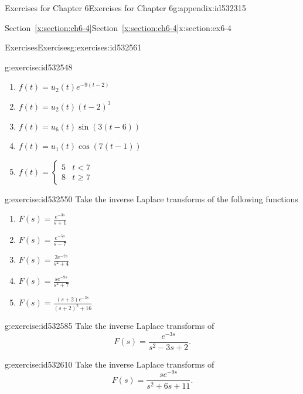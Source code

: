 \documentclass[oneside,10pt,]{book}
\newcommand{\xreffont}{\relax}
\numberwithin{equation}{section}
\numberwithin{equation}{section}
\newcommand{\lt}{<}
\newcommand{\amp}{&}
\begin{document}
\begin{appendixptx}{Exercises for Chapter 6}{}{Exercises for Chapter 6}{}{}{g:appendix:id532315}
\begin{sectionptx}{Section~{\xreffont\ref*{x:section:ch6-4}}}{}{Section~{\xreffont\ref*{x:section:ch6-4}}}{}{}{x:section:ex6-4}
\begin{exercises-subsection-numberless}{Exercises}{}{Exercises}{}{}{g:exercises:id532561}
\begin{divisionexercise}{1}{}{}{g:exercise:id532548}
\begin{enumerate}[label=(\alph*)]
\item{}\(\displaystyle f(t)=u_{2}(t)e^{-9\left(t-2\right)}\)%
\item{}\(\displaystyle f(t)=u_{2}(t)\left(t-2\right)^{3}\)%
\item{}\(\displaystyle f(t)=u_{6}(t)\sin\left(3\left(t-6\right)\right)\)%
\item{}\(\displaystyle f(t)=u_{1}(t)\cos\left(7\left(t-1\right)\right)\)%
\item{}\(\displaystyle {\displaystyle f(t)=\begin{cases}
5 \amp t \lt 7\\
8 \amp t\geq7
\end{cases}} \)%
\end{enumerate}
%
\end{divisionexercise}%
\begin{divisionexercise}{2}{}{}{g:exercise:id532550}%
Take the inverse Laplace transforms of the following functions%
\begin{enumerate}[label=(\alph*)]
\item{}\(\displaystyle F(s)=\frac{e^{-3s}}{s+1}\)%
\item{}\(\displaystyle F(s)=\frac{e^{-5s}}{s-7}\)%
\item{}\(\displaystyle F(s)=\frac{2e^{-2s}}{s^{2}+4}\)%
\item{}\(\displaystyle F(s)=\frac{se^{-9s}}{s^{2}+7}\)%
\item{}\(\displaystyle F(s)=\frac{\left(s+2\right)e^{-3s}}{\left(s+2\right)^{2}+16}\)%
\end{enumerate}
%
\end{divisionexercise}%
\begin{divisionexercise}{3}{}{}{g:exercise:id532585}%
Take the inverse Laplace transforms of%
\begin{equation*}
F(s)=\frac{e^{-3s}}{s^{2}-3s+2}.
\end{equation*}
%
\end{divisionexercise}%
\begin{divisionexercise}{4}{}{}{g:exercise:id532610}%
Take the inverse Laplace transforms of%
\begin{equation*}
F(s)=\frac{se^{-9s}}{s^{2}+6s+11}.
\end{equation*}
%
\end{divisionexercise}%
\end{exercises-subsection-numberless}
\end{sectionptx}
%
%
\typeout{************************************************}
\typeout{Section G.5 Section~{\xreffont\ref*{x:section:ch6-5}}}

\end{appendixptx}
\end{document}

